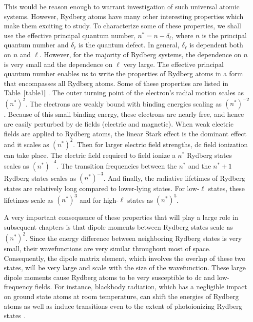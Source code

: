 This would be reason enough to warrant investigation of such universal atomic
systems.  However, Rydberg atoms have many other interesting properties which
make them exciting to study.  To characterize some of these properties, we
shall use the effective principal quantum number, $n^* = n -
\delta_{\ell}$, where $n$ is the principal quantum number and $\delta_{\ell}$
is the quantum defect.  In general, $\delta_{\ell}$ is dependent both on $n$
and $\ell$.  However, for the majority of Rydberg systems, the dependence on
$n$ is very small and the dependence on $\ell$ very large.  The effective
principal quantum number  enables us to write the properties of Rydberg atoms in
a form that encompasses all Rydberg atoms.  Some of these properties are listed
in Table~\ref{table1} \cite{Gallagher_book,Stebbings_book,Kleppner:86}.  The
outer turning point of the electron's radial motion scales as $(n^*)^2$.  The
electrons are weakly bound with binding energies scaling as $(n^*)^{-2}$. 
Because of this small binding energy, these electrons are nearly free, and hence
are easily perturbed by dc fields (electric and magnetic).  When weak electric
fields are applied to Rydberg atoms, the linear Stark effect is the dominant
effect and it scales as
$(n^*)^2$.  Then for larger electric field strengths, dc field ionization can
take place.  The electric field required to field ionize a $n^*$ Rydberg states
scales as
$(n^*)^{-4}$. The transition frequencies between the $n^*$ and the $n^*+1$
Rydberg states scales as $(n^*)^{-3}$.  And finally, the radiative lifetimes of
Rydberg states are relatively long compared to lower-lying states.  For
low-$\ell$ states, these lifetimes scale as $(n^*)^3$ and for high-$\ell$ states
as $(n^*)^5$.

A very important consequence of these properties that will play a large role in
subsequent chapters is that dipole moments between Rydberg states scale as
$(n^*)^2$.  Since the energy difference between neighboring Rydberg states is
very small, their wavefunctions are very similar throughout most of space. 
Consequently, the dipole matrix element, which involves the overlap of these
two states, will be very large and scale with the size of the wavefunction. 
These large dipole moments cause Rydberg atoms to be very susceptible to
dc and low-frequency fields.  For instance, blackbody radiation, which has a
negligible impact on ground state atoms at room temperature, can shift the
energies of Rydberg atoms \cite{Gallagher:79} as well as induce transitions
even to the extent of photoionizing Rydberg states \cite{Spencer:82}. 

